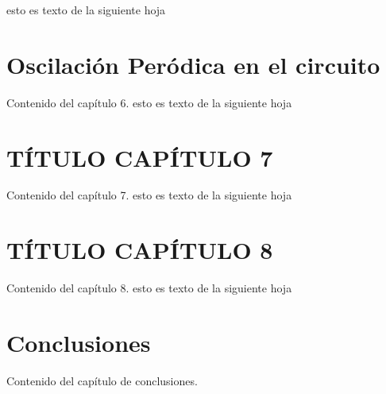 \documentclass[12pt,a4paper]{report} %
\begin{document}
	\newpage
	esto es texto de la siguiente hoja
	
	\chapter{Oscilación Peródica en el circuito}
	Contenido del capítulo 6.
	\newpage
	esto es texto de la siguiente hoja
	
	\chapter{TÍTULO CAPÍTULO 7}
	Contenido del capítulo 7.
	\newpage
	esto es texto de la siguiente hoja
	
	\chapter{TÍTULO CAPÍTULO 8}
	Contenido del capítulo 8.
	\newpage
	esto es texto de la siguiente hoja
	
	\chapter*{Conclusiones}
	Contenido del capítulo de conclusiones.
	\newpage
	
\end{document}

